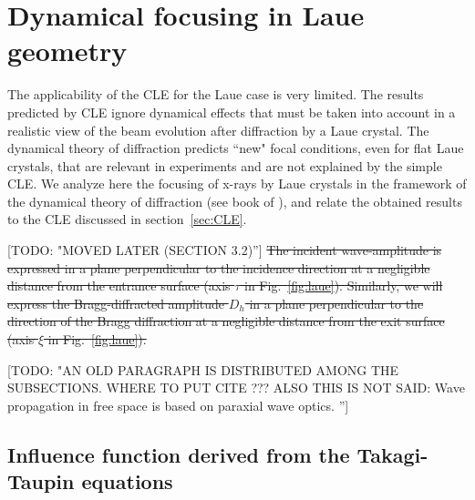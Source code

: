 \documentclass[preprint]{iucr}              %
\newcommand{\todo}[1]{{\color{red}[TODO: "#1'']}}
\begin{document}
\section{Dynamical focusing in Laue geometry}
\label{sec:dynamlicalLaue}

The applicability of the CLE for the Laue case is very limited. The results predicted by CLE ignore dynamical effects that must be taken into account in a realistic view of the beam evolution after diffraction by a Laue crystal. The dynamical theory of diffraction predicts ``new" focal conditions, even for flat Laue crystals, that are relevant in experiments and are not explained by the simple CLE. We analyze here the focusing of x-rays by Laue crystals in the framework of the dynamical theory of diffraction (see book of \cite{authierbook}), and relate the obtained results to the CLE discussed in section~\ref{sec:CLE}.

\todo{MOVED LATER (SECTION 3.2)}\sout{
The incident wave-amplitude is expressed in a plane perpendicular to the incidence direction at a negligible distance from the entrance surface (axis $\tau$ in Fig.~\ref{fig:laue}).
Similarly, we will express the Bragg-diffracted amplitude $D_h$ in a plane perpendicular to the direction of the Bragg diffraction at a negligible distance from the exit surface (axis $\xi$ in Fig.~\ref{fig:laue}).}

\todo{AN OLD PARAGRAPH IS DISTRIBUTED AMONG THE SUBSECTIONS. WHERE TO PUT CITE \cite{kushnir}??? ALSO THIS IS NOT SAID: Wave propagation in free space is based on paraxial wave optics.
}


\subsection{Influence function derived from the Takagi-Taupin equations}
\label{sec:influence}
\end{document}
